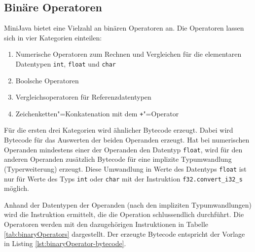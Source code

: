 

\pagebreak
\subsection{Binäre Operatoren}

MiniJava bietet eine Vielzahl an binären Operatoren an. Die Operatoren lassen sich in vier Kategorien einteilen:
\begin{enumerate}
    \item Numerische Operatoren zum Rechnen und Vergleichen für die elementaren Datentypen \lstinline{int}, \lstinline{float} und \lstinline{char}
    \item Boolsche Operatoren
    \item Vergleichsoperatoren für Referenzdatentypen
    \item Zeichenketten"=Konkatenation mit dem \lstinline{+}"=Operator
\end{enumerate}

Für die ersten drei Kategorien wird ähnlicher Bytecode erzeugt. Dabei wird Bytecode für das Auswerten der beiden Operanden erzeugt. Hat bei numerischen Operanden mindestens einer der Operanden den Datentyp \lstinline{float}, wird für den anderen Operanden zusätzlich Bytecode für eine implizite Typumwandlung (Typerweiterung) erzeugt. Diese Umwandlung in Werte des Datentyps \lstinline{float} ist nur für Werte des Typs \lstinline{int} oder \lstinline{char} mit der Instruktion \lstinline{f32.convert_i32_s} möglich.

Anhand der Datentypen der Operanden (nach den impliziten Typumwandlungen) wird die Instruktion ermittelt, die die Operation schlussendlich durchführt. Die Operatoren werden mit den dazugehörigen Instruktionen in Tabelle \ref{tab:binaryOperators} dargestellt. Der erzeugte Bytecode entspricht der Vorlage in Listing \ref{lst:binaryOperator-bytecode}.

